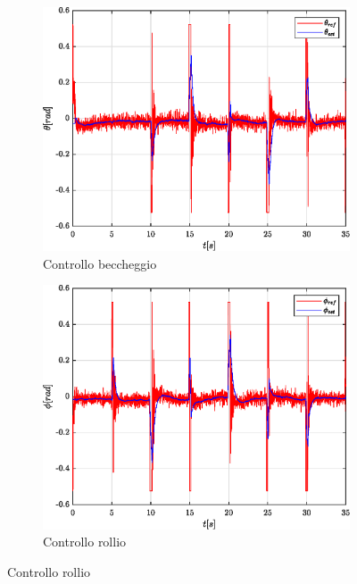 \begin{figure}
	\centering
	\begin{subfigure}{0.45\textwidth}
		\centering
		\includegraphics[width=1\textwidth]{Simulazioni/Figure/PID/SQUARE/AttitudeControlPitch}
		\caption{Controllo beccheggio}
		\label{fig:SQUAREerrbecPID}
	\end{subfigure}
	\hfill
	\begin{subfigure}{0.45\textwidth}
		\centering
		\includegraphics[width=1\textwidth]{Simulazioni/Figure/PID/SQUARE/AttitudeControlRoll}
		\caption{Controllo rollio}
		\label{fig:SQUAREerrrolPID}
	\end{subfigure}

\end{figure}
